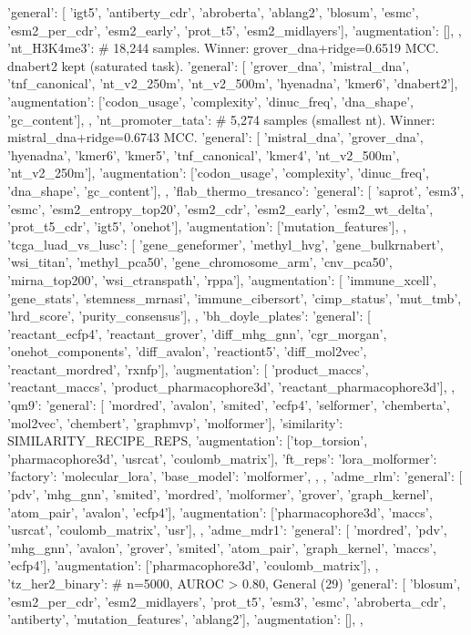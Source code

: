 {{        'general': [
            'igt5', 'antiberty_cdr', 'abroberta', 'ablang2', 'blosum',
            'esmc', 'esm2_per_cdr', 'esm2_early', 'prot_t5', 'esm2_midlayers'],
        'augmentation': [],
    },
    'nt_H3K4me3': {  # 18,244 samples. Winner: grover_dna+ridge=0.6519 MCC. dnabert2 kept (saturated task).
        'general': [
            'grover_dna', 'mistral_dna', 'tnf_canonical', 'nt_v2_250m', 'nt_v2_500m',
            'hyenadna', 'kmer6', 'dnabert2'],
        'augmentation': ['codon_usage', 'complexity', 'dinuc_freq', 'dna_shape', 'gc_content'],
    },
    'nt_promoter_tata': {  # 5,274 samples (smallest nt). Winner: mistral_dna+ridge=0.6743 MCC.
        'general': [
            'mistral_dna', 'grover_dna', 'hyenadna', 'kmer6', 'kmer5',
            'tnf_canonical', 'kmer4', 'nt_v2_500m', 'nt_v2_250m'],
        'augmentation': ['codon_usage', 'complexity', 'dinuc_freq', 'dna_shape', 'gc_content'],
    },
    'flab_thermo_tresanco': {
        'general': [
            'saprot', 'esm3', 'esmc', 'esm2_entropy_top20', 'esm2_cdr',
            'esm2_early', 'esm2_wt_delta', 'prot_t5_cdr', 'igt5', 'onehot'],
        'augmentation': ['mutation_features'],
    },
    'tcga_luad_vs_lusc': { [
            'gene_geneformer', 'methyl_hvg', 'gene_bulkrnabert', 'wsi_titan',
            'methyl_pca50', 'gene_chromosome_arm', 'cnv_pca50', 'mirna_top200',
            'wsi_ctranspath', 'rppa'],
        'augmentation': [
            'immune_xcell', 'gene_stats', 'stemness_mrnasi',
            'immune_cibersort', 'cimp_status', 'mut_tmb',
            'hrd_score', 'purity_consensus'],
    },
    'bh_doyle_plates': {
        'general': [
            'reactant_ecfp4', 'reactant_grover', 'diff_mhg_gnn', 'cgr_morgan',
            'onehot_components', 'diff_avalon', 'reactiont5', 'diff_mol2vec',
            'reactant_mordred', 'rxnfp'],
        'augmentation': [
            'product_maccs', 'reactant_maccs',
            'product_pharmacophore3d',
            'reactant_pharmacophore3d'],
    },
    'qm9': {
        'general': [
            'mordred', 'avalon', 'smited', 'ecfp4', 'selformer', 'chemberta',
            'mol2vec', 'chembert', 'graphmvp', 'molformer'],
        'similarity': SIMILARITY_RECIPE_REPS,
        'augmentation': ['top_torsion', 'pharmacophore3d', 'usrcat', 'coulomb_matrix'],
        'ft_reps': {
            'lora_molformer': {'factory': 'molecular_lora', 'base_model': 'molformer'},
        },
    },
    'adme_rlm': {
        'general': [
            'pdv', 'mhg_gnn', 'smited', 'mordred', 'molformer', 'grover',
            'graph_kernel', 'atom_pair', 'avalon', 'ecfp4'],
        'augmentation': ['pharmacophore3d', 'maccs', 'usrcat', 'coulomb_matrix', 'usr'],
    },
    'adme_mdr1': {
        'general': [
            'mordred', 'pdv', 'mhg_gnn', 'avalon', 'grover', 'smited',
            'atom_pair', 'graph_kernel', 'maccs', 'ecfp4'],
        'augmentation': ['pharmacophore3d', 'coulomb_matrix'],
    },
    'tz_her2_binary': {  # n=5000, AUROC > 0.80, General (29)
        'general': [
            'blosum', 'esm2_per_cdr', 'esm2_midlayers', 'prot_t5', 'esm3',
            'esmc', 'abroberta_cdr', 'antiberty', 'mutation_features', 'ablang2'],
        'augmentation': [],
    },

}
